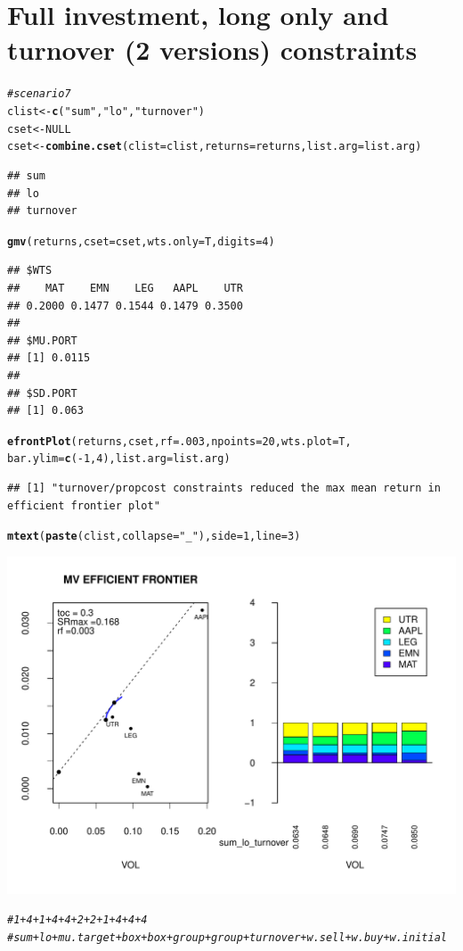 \documentclass{uwstat518}\usepackage[]{graphicx}\usepackage[]{color}
\makeatletter
\def\maxwidth{ %
  \ifdim\Gin@nat@width>\linewidth
    \linewidth
  \else
    \Gin@nat@width
  \fi
}
\newcommand{\hlstr}[1]{\textcolor[rgb]{0.192,0.494,0.8}{#1}}%
\newcommand{\hlcom}[1]{\textcolor[rgb]{0.678,0.584,0.686}{\textit{#1}}}%
\newcommand{\hlkwd}[1]{\textcolor[rgb]{0.737,0.353,0.396}{\textbf{#1}}}%
\newenvironment{kframe}{%
 \def\at@end@of@kframe{}%
 \ifinner\ifhmode%
  \def\at@end@of@kframe{\end{minipage}}%
  \begin{minipage}{\columnwidth}%
 \fi\fi%
 \def\FrameCommand##1{\hskip\@totalleftmargin \hskip-\fboxsep
 \colorbox{shadecolor}{##1}\hskip-\fboxsep
     \hskip-\linewidth \hskip-\@totalleftmargin \hskip\columnwidth}%
 \MakeFramed {\advance\hsize-\width
   \@totalleftmargin\z@ \linewidth\hsize
   \@setminipage}}%
 {\par\unskip\endMakeFramed%
 \at@end@of@kframe}
\newenvironment{knitrout}{}{} %
\makeatother
\begin{document}
\newpage
\section{Full investment, long only and turnover (2 versions) constraints}
\begin{knitrout}
\color{fgcolor}\begin{kframe}
\begin{alltt}
\hlcom{# scenario 7}
clist <- \hlkwd{c}(\hlstr{"sum"},\hlstr{"lo"},\hlstr{"turnover"})
cset <- NULL
cset <-\hlkwd{combine.cset}(clist=clist,returns=returns,list.arg=list.arg)
\end{alltt}
\begin{verbatim}
## sum 
## lo 
## turnover
\end{verbatim}
\begin{alltt}
\hlkwd{gmv}(returns, cset=cset, wts.only=T,digits=4)
\end{alltt}
\begin{verbatim}
## $WTS
##    MAT    EMN    LEG   AAPL    UTR 
## 0.2000 0.1477 0.1544 0.1479 0.3500 
## 
## $MU.PORT
## [1] 0.0115
## 
## $SD.PORT
## [1] 0.063
\end{verbatim}
\begin{alltt}
\hlkwd{efrontPlot}(returns, cset, rf = .003, npoints = 20,wts.plot = T,
		bar.ylim = \hlkwd{c}(-1,4),list.arg=list.arg)
\end{alltt}
\begin{verbatim}
## [1] "turnover/propcost constraints reduced the max mean return in efficient frontier plot"
\end{verbatim}
\begin{alltt}
\hlkwd{mtext}(\hlkwd{paste}(clist,collapse=\hlstr{"_"}),side=1,line=3)
\end{alltt}
\end{kframe}
\includegraphics[width=\maxwidth]{figure/unnamed-chunk-101} 
\begin{kframe}\begin{alltt}
\hlcom{# 1+4+1+4+4+2+2+1+4+4+4  }
\hlcom{# sum+lo+mu.target+box+box+group+group+turnover+w.sell+w.buy+w.initial}


\end{alltt}
\end{kframe}
\end{knitrout}
\end{document}
